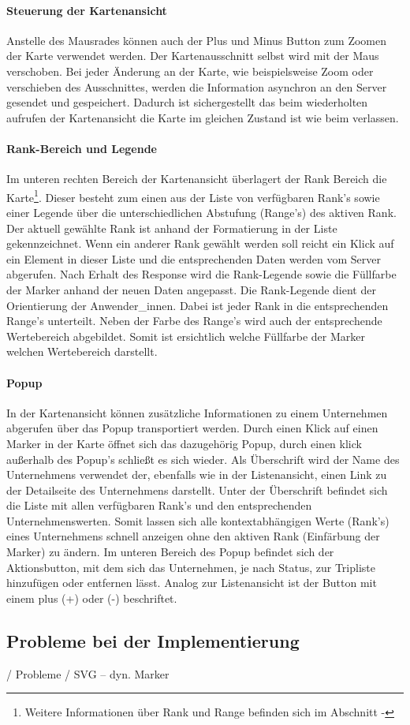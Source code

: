 \documentclass[Bachelorarbeit.tex]{subfiles}
\begin{document}
\paragraph{Steuerung der Kartenansicht}
Anstelle des Mausrades können auch der Plus und Minus Button zum Zoomen der Karte verwendet werden.
Der Kartenausschnitt selbst wird mit der Maus verschoben.
Bei jeder Änderung an der Karte, wie beispielsweise Zoom oder verschieben des Ausschnittes, werden die Information asynchron an den Server gesendet und gespeichert.
Dadurch ist sichergestellt das beim wiederholten aufrufen der Kartenansicht die Karte im gleichen Zustand ist wie beim verlassen.

\paragraph{Rank-Bereich und Legende}
Im unteren rechten Bereich der Kartenansicht überlagert der Rank Bereich die Karte\footnote{Weitere Informationen über Rank und Range befinden sich im Abschnitt  - }.
Dieser besteht zum einen aus der Liste von verfügbaren Rank's sowie einer Legende über die unterschiedlichen Abstufung (Range's) des aktiven Rank.
Der aktuell gewählte Rank ist anhand der Formatierung in der Liste gekennzeichnet. 
Wenn ein anderer Rank gewählt werden soll reicht ein Klick auf ein Element in dieser Liste und die entsprechenden Daten werden vom Server abgerufen. 
Nach Erhalt des Response wird die Rank-Legende sowie die Füllfarbe der Marker anhand der neuen Daten angepasst.
Die Rank-Legende dient der Orientierung der Anwender\_innen. 
Dabei ist jeder Rank in die entsprechenden Range's unterteilt.
Neben der Farbe des Range's wird auch der entsprechende Wertebereich abgebildet.
Somit ist ersichtlich welche Füllfarbe der Marker welchen Wertebereich darstellt.

\paragraph{Popup}
In der Kartenansicht können zusätzliche Informationen zu einem Unternehmen abgerufen über das Popup transportiert werden.
Durch einen Klick auf einen Marker in der Karte öffnet sich das dazugehörig Popup, durch einen klick außerhalb des Popup's schließt es sich wieder. 
Als Überschrift wird der Name des Unternehmens verwendet der, ebenfalls wie in der Listenansicht, einen Link zu der Detailseite des Unternehmens darstellt. 
Unter der Überschrift befindet sich die Liste mit allen verfügbaren Rank's und den entsprechenden Unternehmenswerten. 
Somit lassen sich alle kontextabhängigen Werte (Rank's) eines Unternehmens schnell anzeigen ohne den aktiven Rank (Einfärbung der Marker) zu ändern. 
Im unteren Bereich des Popup befindet sich der Aktionsbutton, mit dem sich das Unternehmen, je nach Status, zur Tripliste hinzufügen oder entfernen lässt.
Analog zur Listenansicht ist der Button mit einem plus (+) oder (-) beschriftet.

\subsection{Probleme bei der Implementierung}
/ Probleme
/ SVG -- dyn. Marker
\end{document}

